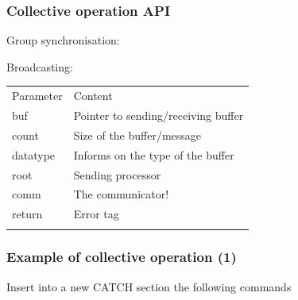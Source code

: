 \subsubsection{Collective operation API}\label{collective-operation-api}

Group synchronisation:

\begin{Shaded}
\begin{Highlighting}[]
 
\end{Highlighting}
\end{Shaded}

Broadcasting:

\begin{Shaded}
\begin{Highlighting}[]
    
\end{Highlighting}
\end{Shaded}

\begin{longtable}[c]{@{}ll@{}}
\toprule\addlinespace
Parameter & Content
\\\addlinespace
\midrule\endhead
buf & Pointer to sending/receiving buffer
\\\addlinespace
count & Size of the buffer/message
\\\addlinespace
datatype & Informs on the type of the buffer
\\\addlinespace
root & Sending processor
\\\addlinespace
comm & The communicator!
\\\addlinespace
return & Error tag
\\\addlinespace
\bottomrule
\end{longtable}

\subsubsection{Example of collective operation
(1)}\label{example-of-collective-operation-1}

Insert into a new CATCH section the following commands

